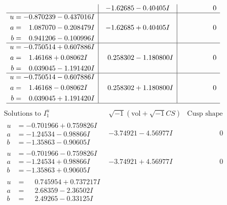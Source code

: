 \documentclass[1p]{elsarticle_modified}
\theoremstyle{definition}
\newcommand{\I}{\sqrt{-1}}
\begin{document}
$$\begin{array}{c|c|c}
 & -1.62685 - 0.40405 I & \phantom{-0.000000 } 0 \\ \hline\begin{aligned}
u &= -0.870239 - 0.437016 I \\
a &= \phantom{-}1.087070 - 0.208479 I \\
b &= \phantom{-}0.941206 - 0.100996 I\end{aligned}
 & -1.62685 + 0.40405 I & \phantom{-0.000000 } 0 \\ \hline\begin{aligned}
u &= -0.750514 + 0.607886 I \\
a &= \phantom{-}1.46168 + 0.08062 I \\
b &= \phantom{-}0.039045 - 1.191420 I\end{aligned}
 & \phantom{-}0.258302 - 1.180800 I & \phantom{-0.000000 } 0 \\ \hline\begin{aligned}
u &= -0.750514 - 0.607886 I \\
a &= \phantom{-}1.46168 - 0.08062 I \\
b &= \phantom{-}0.039045 + 1.191420 I\end{aligned}
 & \phantom{-}0.258302 + 1.180800 I & \phantom{-0.000000 } 0\\
 \hline 
 \end{array}$$\newpage$$\begin{array}{c|c|c}  
\text{Solutions to }I^u_{1}& \I (\text{vol} + \sqrt{-1}CS) & \text{Cusp shape}\\
 \hline 
\begin{aligned}
u &= -0.701966 + 0.759826 I \\
a &= -1.24534 - 0.98866 I \\
b &= -1.35863 - 0.90605 I\end{aligned}
 & -3.74921 - 4.56977 I & \phantom{-0.000000 } 0 \\ \hline\begin{aligned}
u &= -0.701966 - 0.759826 I \\
a &= -1.24534 + 0.98866 I \\
b &= -1.35863 + 0.90605 I\end{aligned}
 & -3.74921 + 4.56977 I & \phantom{-0.000000 } 0 \\ \hline\begin{aligned}
u &= \phantom{-}0.745954 + 0.737217 I \\
a &= \phantom{-}2.68359 - 2.36502 I \\
b &= \phantom{-}2.49265 - 0.33125 I\end{aligned}

\end{array}$$
\end{document}
